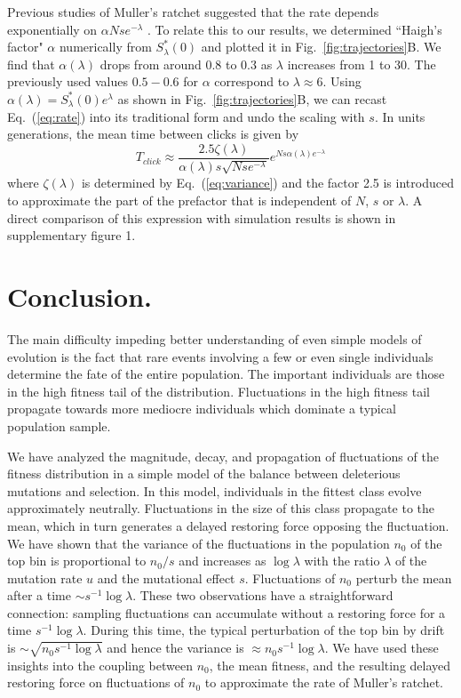 \documentclass[rmp,preprint]{revtex4}
\newcommand{\EQ}[1]{Eq.~(\ref{eq:#1})}
\newcommand{\FIG}[1]{Fig.~\ref{fig:#1}}
\newcommand{\n}{n}
\newcommand{\Smin}{S^*}
\newcommand{\mut}{u}
\begin{document}
Previous studies of Muller's ratchet suggested that the rate depends exponentially on $\alpha Nse^{-\lambda}$ \citep{Jain:2008p45047}. To relate this to our results, we determined ``Haigh's factor" $\alpha$ numerically from $\Smin_\lambda(0)$ and plotted it in \FIG{trajectories}B. We find that $\alpha(\lambda)$ drops from around 0.8 to 0.3 as $\lambda$ increases from 1 to 30. The previously used values $0.5-0.6$ for $\alpha$ correspond to $\lambda\approx 6$. Using $\alpha(\lambda) = \Smin_\lambda(0) e^{\lambda}$ as shown in \FIG{trajectories}B, we can recast \EQ{rate} into its traditional form and undo the scaling with $s$. In units generations, the mean time between clicks is given by
\begin{equation}
T_{click} \approx \frac{2.5\zeta(\lambda)}{\alpha(\lambda)s \sqrt{Nse^{-\lambda}}}e^{Ns \alpha(\lambda)e^{-\lambda}}
\end{equation}
where $\zeta(\lambda)$ is determined by \EQ{variance} and the factor 2.5 is introduced to approximate the part of the prefactor that is independent of $N$, $s$ or $\lambda$. A direct comparison of this expression with simulation results is shown in supplementary figure 1.



\section{Conclusion.}
The main difficulty impeding better understanding of even simple models of evolution is the fact that rare events involving a few or even single individuals determine the fate of the entire population. The important individuals are those in the high fitness tail of the distribution. Fluctuations in the high fitness tail propagate towards more mediocre individuals which dominate a typical population sample. 

We have analyzed the magnitude, decay, and propagation of fluctuations of the fitness distribution in a simple model of the balance between deleterious mutations and selection. In this model, individuals in the fittest class evolve approximately neutrally. Fluctuations in the size of this class propagate to the mean, which in turn generates a delayed restoring force opposing the fluctuation. We have shown that the variance of the fluctuations in the population $\n_0$ of the top bin is proportional to $\n_0/s$ and increases as $\log \lambda$ with the ratio $\lambda$ of the mutation rate $\mut$ and the mutational effect $s$. Fluctuations of $\n_0$ perturb the mean after a time $\sim s^{-1}\log \lambda$. These two observations have a straightforward connection: sampling fluctuations can accumulate without a restoring force for a time $s^{-1} \log \lambda$. During this time, the typical perturbation of the top bin by drift is $\sim \sqrt{\n_0 s^{-1}\log \lambda}$ and hence the variance is $\approx  \n_0 s^{-1}\log \lambda$. We have used these insights into the coupling between $\n_0$, the mean fitness, and the resulting delayed restoring force on fluctuations of $\n_0$ to approximate the rate of Muller's ratchet. 
\end{document}
